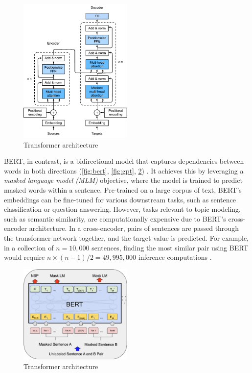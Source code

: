 \begin{figure}[h]
    \centering
    \includegraphics[width=0.5\textwidth]{figures/transformer.pdf}
    \caption{Transformer architecture}
    \label{fig:transformer}
\end{figure}

BERT, in contrast, is a bidirectional model that captures dependencies between words in both directions (\cref{fig:bert}, \cref{fig:gpt}, \cref{fig:bert_detailed}) \cite{vaswani_attention_2017, devlin_bert_2019}. It achieves this by leveraging a \textit{masked language model (MLM)} objective, where the model is trained to predict masked words within a sentence. Pre-trained on a large corpus of text, BERT’s embeddings can be fine-tuned for various downstream tasks, such as sentence classification or question answering. However, tasks relevant to topic modeling, such as semantic similarity, are computationally expensive due to BERT's cross-encoder architecture. In a cross-encoder, pairs of sentences are passed through the transformer network together, and the target value is predicted. For example, in a collection of \( n = 10,000 \) sentences, finding the most similar pair using BERT would require \( n \times (n-1) / 2 = 49,995,000 \) inference computations \cite{reimers_sentence-bert_2019}.

\begin{figure}[h]
    \centering
    \includegraphics[width=0.5\textwidth]{figures/bert_detailed.png}
    \caption{Transformer architecture}
    \label{fig:bert_detailed}
\end{figure}


